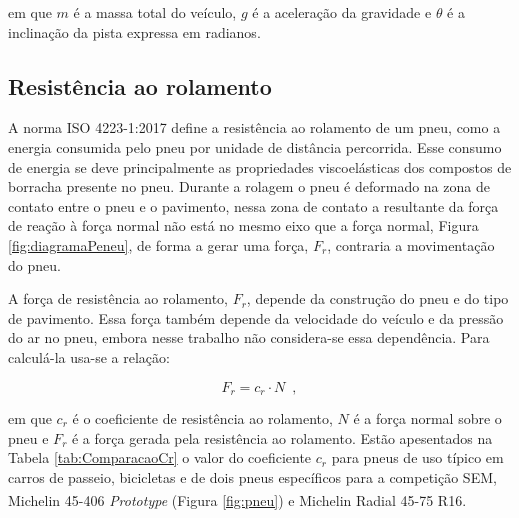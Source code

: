 em que $m$ é a massa total do veículo, $g$ é a aceleração da gravidade e $\theta$ é a inclinação da pista expressa em
radianos\cite{book:guzzella2012vehicle}.

\subsection{Resistência ao rolamento}
\label{subsec:resistencia_rolamento}

A norma ISO 4223-1:2017 define a resistência ao rolamento de um pneu, como a energia consumida pelo pneu por unidade de distância 
percorrida. Esse consumo de energia se deve principalmente as propriedades viscoelásticas dos compostos de borracha presente no pneu.
Durante a rolagem o pneu é deformado na zona de contato entre o pneu e o pavimento, nessa zona de contato a resultante da força de reação à força
normal não
está no mesmo eixo que a força normal, Figura \ref{fig:diagramaPeneu}, de forma a gerar uma força, $F_{r}$, contraria a movimentação do pneu.



A força de resistência ao rolamento, $F_{r}$, depende da construção do pneu e do tipo de pavimento. Essa força também depende da velocidade do
veículo e da pressão do ar no pneu,
embora nesse trabalho não considera-se essa dependência. Para calculá-la usa-se a relação:

\begin{equation}
	\label{eq:Fr}
	F_{r}  = c_{r} \cdot N
	\enspace,
\end{equation}

em que $c_{r}$ é o coeficiente de resistência ao rolamento, $N$ é a força normal sobre o pneu e $F_{r}$ é a força
gerada pela resistência ao rolamento.
Estão apesentados na Tabela \ref{tab:ComparacaoCr}
o valor do coeficiente $c_{r}$ para pneus de uso típico em carros de passeio, bicicletas e de dois pneus específicos para a competição SEM,
Michelin\textsuperscript{\textregistered}
45-406 \textit{Prototype} (Figura \ref{fig:pneu}) e Michelin\textsuperscript{\textregistered} Radial 45-75 R16.


